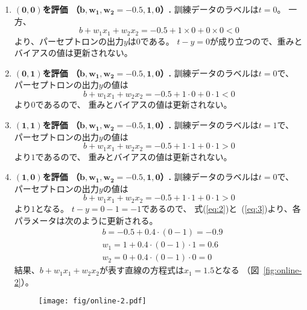 \begin{enumerate}\renewcommand\labelenumi{\textbf{ステップ\arabic{enumi}. }}
\item \textbf{$\boldsymbol{(0, 0)}$を評価
    （$\boldsymbol{b, w_1, w_2 = -0.5, 1, 0}$）. }
  訓練データのラベルは$t = 0$。
  一方、
  \[
    b + w_1x_1 + w_2x_2 =
    -0.5 + 1\times 0 + 0\times 0 < 0
  \]
  より、パーセプトロンの出力$y$は$0$である。
  $t - y = 0$が成り立つので、重みとバイアスの値は更新されない。
\item \textbf{$\boldsymbol{(0, 1)}$を評価
    （$\boldsymbol{b, w_1, w_2 = -0.5, 1, 0}$）. }
  訓練データのラベルは$t = 0$で、
  パーセプトロンの出力$y$の値は
  \[
    b + w_1x_1 + w_2x_2 =
    -0.5 + 1\cdot 0 + 0\cdot 1 < 0
  \]
  より$0$であるので、
  重みとバイアスの値は更新されない。
\item \textbf{$\boldsymbol{(1, 1)}$を評価
    （$\boldsymbol{b, w_1, w_2 = -0.5, 1, 0}$）. }
  訓練データのラベルは$t = 1$で、
  パーセプトロンの出力$y$の値は
  \[
    b + w_1x_1 + w_2x_2 =
    -0.5 + 1\cdot 1 + 0\cdot 1 > 0
  \]
  より$1$であるので、
  重みとバイアスの値は更新されない。
\item\label{item:1}
  \textbf{$\boldsymbol{(1, 0)}$を評価
    （$\boldsymbol{b, w_1, w_2 = -0.5, 1, 0}$）. }
  訓練データのラベルは$t = 0$で、
  パーセプトロンの出力$y$の値は
  \[
    b + w_1x_1 + w_2x_2 =
    -0.5 + 1\cdot 1 + 0\cdot 1 > 0
  \]
  より$1$となる。
  $t - y = 0 - 1 = -1$であるので、
  式(\ref{eq:2})と~(\ref{eq:3})より、各パラメータは次のように更新される。
  \begin{align*}
    &
      b = -0.5 + 0.4\cdot (0 - 1) = - 0.9
    \\&
    w_1 = 1 + 0.4\cdot (0 - 1)\cdot 1 = 0.6
    \\&
    w_2 = 0 + 0.4\cdot (0 - 1)\cdot 0 = 0
  \end{align*}
  結果、$b + w_1x_1 + w_2x_2$が表す直線の方程式は$x_1 = 1.5$となる
  （図~\ref{fig:online-2}）。
  
  \begin{figure}
    \centering
    \texttt{[image: fig/online-2.pdf]}
    

\end{figure}
\end{enumerate}
